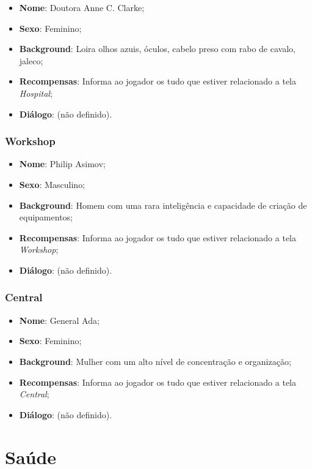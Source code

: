 \documentclass[11pt]{article} %
\begin{document}
\begin{itemize}
  \item \textbf{Nome}: Doutora Anne C. Clarke;
  \item \textbf{Sexo}: Feminino;
  \item \textbf{Background}: Loira olhos azuis, óculos, cabelo preso com rabo de cavalo, jaleco;
  \item \textbf{Recompensas}: Informa ao jogador os tudo que estiver relacionado a tela \textit{Hospital};
  \item \textbf{Diálogo}: (não definido).
\end{itemize}

\subsubsection{Workshop}

\begin{itemize}
  \item \textbf{Nome}: Philip Asimov;
  \item \textbf{Sexo}: Masculino;
  \item \textbf{Background}: Homem com uma rara inteligência e capacidade de criação de equipamentos;
  \item \textbf{Recompensas}: Informa ao jogador os tudo que estiver relacionado a tela \textit{Workshop};
  \item \textbf{Diálogo}: (não definido).
\end{itemize}

\subsubsection{Central}

\begin{itemize}
  \item \textbf{Nome}: General Ada;
  \item \textbf{Sexo}: Feminino;
  \item \textbf{Background}: Mulher com um alto nível de concentração e organização;
  \item \textbf{Recompensas}: Informa ao jogador os tudo que estiver relacionado a tela \textit{Central};
  \item \textbf{Diálogo}: (não definido).
\end{itemize}

\section{Saúde}
\end{document}
